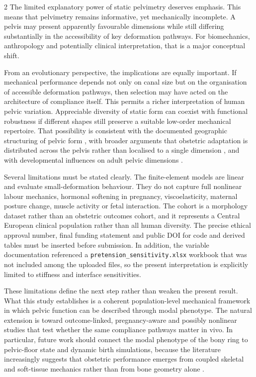 \documentclass[openacc]{rsproca_new}
\begin{document}
\begin{multicols}{2}
The limited explanatory power of static pelvimetry deserves emphasis. This means that pelvimetry remains informative, yet mechanically incomplete. A pelvis may present apparently favourable dimensions while still differing substantially in the accessibility of key deformation pathways. For biomechanics, anthropology and potentially clinical interpretation, that is a major conceptual shift.

From an evolutionary perspective, the implications are equally important. If mechanical performance depends not only on canal size but on the organisation of accessible deformation pathways, then selection may have acted on the architecture of compliance itself. This permits a richer interpretation of human pelvic variation. Appreciable diversity of static form can coexist with functional robustness if different shapes still preserve a suitable low-order mechanical repertoire. That possibility is consistent with the documented geographic structuring of pelvic form \cite{BettiManica2018,Auerbach2018}, with broader arguments that obstetric adaptation is distributed across the pelvis rather than localised to a single dimension \cite{KurkiDecrausaz2015}, and with developmental influences on adult pelvic dimensions \cite{VerbruggenNowlan2017,Novak2020}.

Several limitations must be stated clearly. The finite-element models are linear and evaluate small-deformation behaviour. They do not capture full nonlinear labour mechanics, hormonal softening in pregnancy, viscoelasticity, maternal posture change, muscle activity or fetal interaction. The cohort is a morphology dataset rather than an obstetric outcomes cohort, and it represents a Central European clinical population rather than all human diversity. The precise ethical approval number, final funding statement and public DOI for code and derived tables must be inserted before submission. In addition, the variable documentation referenced a \texttt{pretension\_sensitivity.xlsx} workbook that was not included among the uploaded files, so the present interpretation is explicitly limited to stiffness and interface sensitivities.

These limitations define the next step rather than weaken the present result. What this study establishes is a coherent population-level mechanical framework in which pelvic function can be described through modal phenotype. The natural extension is toward outcome-linked, pregnancy-aware and possibly nonlinear studies that test whether the same compliance pathways matter in vivo. In particular, future work should connect the modal phenotype of the bony ring to pelvic-floor state and dynamic birth simulations, because the literature increasingly suggests that obstetric performance emerges from coupled skeletal and soft-tissue mechanics rather than from bone geometry alone \cite{Pavlicev2020,Fremondiere2022}.


\end{multicols}
\end{document}

